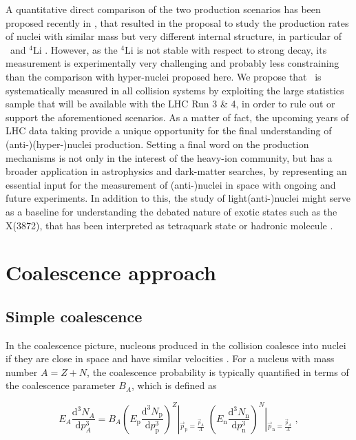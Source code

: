 \documentclass[a4paper,11pt]{scrartcl}
\begin{document}
A quantitative direct comparison of the two production scenarios has been proposed recently in \cite{Mrowczynski:2016xqm}, that resulted in the proposal to study the production rates of nuclei with similar mass but very different internal structure, in particular of \hefour~and ${}^{4}\mathrm{Li}$ \cite{Bazak:2018hgl}. However, as the ${}^{4}\mathrm{Li}$ is not stable with respect to strong decay, its measurement is experimentally very challenging and probably less constraining than the comparison with hyper-nuclei proposed here.
We propose that \bA~is systematically measured in all collision systems by exploiting the large statistics sample that will be available with the LHC Run 3 \& 4, in order to rule out or support the aforementioned scenarios. As a matter of fact, the upcoming years of LHC data taking provide a unique opportunity for the final understanding of (anti-)(hyper-)nuclei production.
Setting a final word on the production mechanisms is not only in the interest of the heavy-ion community, but has a broader application in astrophysics and dark-matter searches, by representing an essential input for the measurement of (anti-)nuclei in space with ongoing \cite{Alcaraz:2000ss} and future \cite{AMS100, Aramaki:2015laa} experiments. 
In addition to this, the study of light(anti-)nuclei might serve as a baseline for understanding the debated nature of exotic states such as the X(3872), that has been interpreted as tetraquark state or hadronic molecule \cite{Esposito:2015fsa, Cho:2017dcy}.


\section{Coalescence approach} 
\label{sec:coalescence}

\subsection{Simple coalescence}
In the coalescence picture, nucleons produced in the collision coalesce into nuclei if they are close in space and have similar velocities \cite{Butler:1963,Kapusta:1980}. For a nucleus with mass number $A = Z + N$, the coalescence probability is typically quantified in terms of the coalescence parameter $B_{A}$, which is defined as

\begin{equation}
E_{A}\frac{\mathrm{d}^{3}N_{A}}{\mathrm{d}p_{A}^{3}}=B_{A}{\left(E_{\mathrm{p}}\frac{\mathrm{d}^{3}N_{\mathrm{p}}}{\mathrm{d}p_{\mathrm{p}}^{3}}\right)^{Z}\left\vert_{\vec{p}_{\mathrm{p}}=\frac{\vec{p}_{A}}{A}} \right.\;
   \left(E_{\mathrm{n}}\frac{\mathrm{d}^{3}N_{\mathrm{n}}}{\mathrm{d}p_{\mathrm{n}}^{3}}\right)^{N}}\left\vert_{\vec{p}_{\mathrm{n}}=\frac{\vec{p}_{A}}{A}} \right.\;
,    
\label{eq:BA}
\end{equation}
\end{document}
